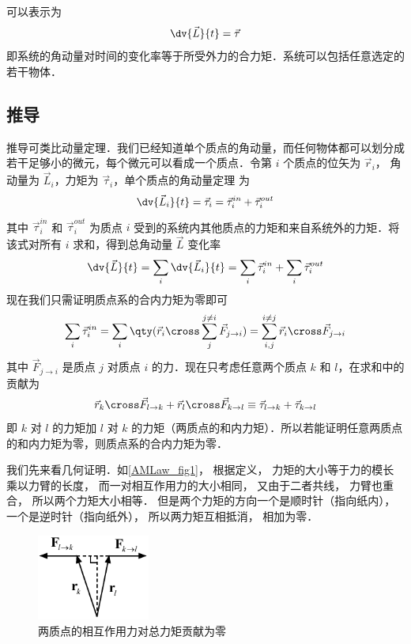
可以表示为
\begin{equation}\label{AMLaw_eq1}
\dv{\vec L}{t} = \vec \tau
\end{equation}
即系统的角动量对时间的变化率等于所受外力的合力矩．系统可以包括任意选定的若干物体．

\subsection{推导}
推导可类比动量定理．我们已经知道单个质点的角动量，而任何物体都可以划分成若干足够小的微元，每个微元可以看成一个质点．令第 $i$ 个质点的位矢为 $\vec r_i$， 角动量为 $\vec L_i$，力矩为 $\vec \tau_i$，单个质点的角动量定理 为
\begin{equation}
\dv{\vec L_i}{t} = \vec \tau_i = \vec \tau_i^{in} + \vec \tau_i^{out}
\end{equation}
其中 $\vec \tau_i^{in}$ 和 $\vec \tau_i^{out}$ 为质点 $i$ 受到的系统内其他质点的力矩和来自系统外的力矩．将该式对所有 $i$ 求和，得到总角动量 $\vec L$ 变化率
\begin{equation}
\dv{\vec L}{t} =\sum_i\dv{\vec L_i}{t} = \sum_i\vec \tau_i^{in} + \sum_i\vec \tau_i^{out}
\end{equation}
现在我们只需证明质点系的合内力矩为零即可
\begin{equation}
\sum_i\vec \tau_i^{in} = \sum_i \qty(\vec r_i\cross\sum_j^{j\ne i}\vec F_{j\to i}) = \sum_{i,j}^{i\ne j} \vec r_i\cross\vec F_{j\to i}
\end{equation}
其中 $\vec F_{j\to i}$ 是质点 $j$ 对质点 $i$ 的力．现在只考虑任意两个质点 $k$ 和 $l$，在求和中的贡献为
\begin{equation}
\vec r_k\cross\vec F_{l\to k} + \vec r_l\cross\vec F_{k\to l} \equiv \vec \tau_{l\to k}+ \vec \tau_{k\to l}
\end{equation}
即 $k$ 对 $l$ 的力矩加 $l$ 对 $k$ 的力矩（两质点的和内力矩）．所以若能证明任意两质点的和内力矩为零，则质点系的合内力矩为零．

我们先来看几何证明．如\autoref{AMLaw_fig1}， 根据定义， 力矩的大小等于力的模长乘以力臂的长度， 而一对相互作用力的大小相同， 又由于二者共线， 力臂也重合， 所以两个力矩大小相等． 但是两个力矩的方向一个是顺时针（指向纸内）， 一个是逆时针（指向纸外）， 所以两力矩互相抵消， 相加为零．

\begin{figure}[ht]
\centering
\includegraphics[width=3.7cm]{./figures/AMLaw1.pdf}
\caption{两质点的相互作用力对总力矩贡献为零}\label{AMLaw_fig1}
\end{figure}

